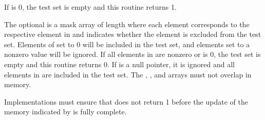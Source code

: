 \begin{apidefinition}
{    If  is 0, the test set is empty and this routine returns 1.

    The optional  is a mask array of length  where each element
    corresponds to the respective element in  and indicates whether
    the element is excluded from the test set.  Elements of  set to
    0 will be included in the test set, and elements set to a nonzero value will be ignored.  If all elements
    in  are nonzero or  is 0, the test set is empty
    and this routine returns 0.  If  is a null pointer, it is
    ignored and all elements in  are included in the test set.  The
    , , and  arrays must not overlap in
    memory.

    Implementations must ensure that  does not return 1
    before the update of the memory indicated by  is fully complete.
}


\end{apidefinition}
